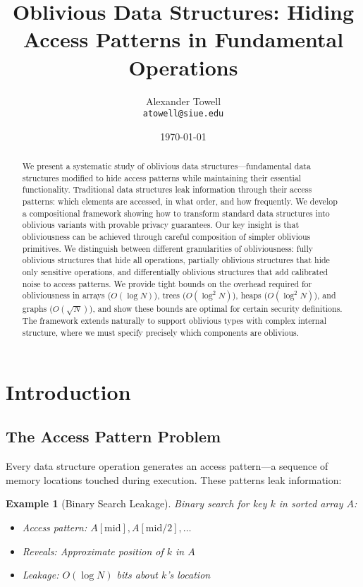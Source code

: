 \documentclass[11pt,final,hidelinks]{article}
\title{Oblivious Data Structures: Hiding Access Patterns in Fundamental Operations}
\author{
    Alexander Towell\\
    \texttt{atowell@siue.edu}
}
\date{\today}
\newtheorem{example}[theorem]{Example}
\begin{document}
\maketitle

\begin{abstract}
We present a systematic study of oblivious data structures—fundamental data structures modified to hide access patterns while maintaining their essential functionality. Traditional data structures leak information through their access patterns: which elements are accessed, in what order, and how frequently. We develop a compositional framework showing how to transform standard data structures into oblivious variants with provable privacy guarantees. Our key insight is that obliviousness can be achieved through careful composition of simpler oblivious primitives. We distinguish between different granularities of obliviousness: fully oblivious structures that hide all operations, partially oblivious structures that hide only sensitive operations, and differentially oblivious structures that add calibrated noise to access patterns. We provide tight bounds on the overhead required for obliviousness in arrays ($O(\log N)$), trees ($O(\log^2 N)$), heaps ($O(\log^2 N)$), and graphs ($O(\sqrt{N})$), and show these bounds are optimal for certain security definitions. The framework extends naturally to support oblivious types with complex internal structure, where we must specify precisely which components are oblivious.
\end{abstract}

\ObliviousNotationGuide

\section{Introduction}

\subsection{The Access Pattern Problem}

Every data structure operation generates an access pattern—a sequence of memory locations touched during execution. These patterns leak information:

\begin{example}[Binary Search Leakage]
Binary search for key $k$ in sorted array $A$:
\begin{itemize}
    \item Access pattern: $A[\text{mid}], A[\text{mid}/2], \ldots$
    \item Reveals: Approximate position of $k$ in $A$
    \item Leakage: $O(\log N)$ bits about $k$'s location
\end{itemize}
\end{example}
\end{document}
